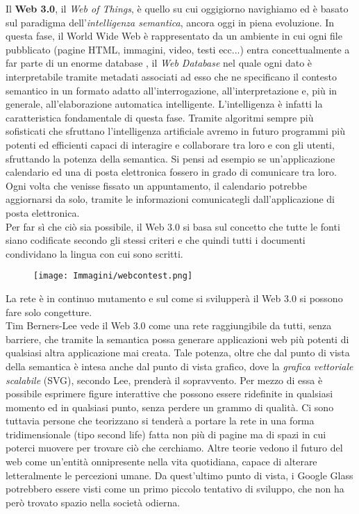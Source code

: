 \documentclass[a4paper, 11pt, oneside]{book}
\theoremstyle{plain}
\begin{document}
Il \textbf{Web 3.0}, il \textit{Web of Things}, è quello su cui oggigiorno navighiamo ed è basato sul paradigma dell'\textit{intelligenza semantica}, ancora oggi in piena evoluzione. In questa fase, il World Wide Web è rappresentato da un ambiente in cui ogni file pubblicato (pagine HTML, immagini, video, testi ecc...) entra concettualmente a far parte di un enorme database , il\textit{ Web Database} nel quale ogni dato è interpretabile tramite metadati associati ad esso che ne specificano il contesto semantico in un formato adatto all'interrogazione, all'interpretazione e, più in generale, all'elaborazione automatica intelligente. L'intelligenza è infatti la caratteristica fondamentale di questa fase. Tramite algoritmi sempre più sofisticati che sfruttano l'intelligenza artificiale avremo in futuro programmi più potenti ed efficienti capaci di interagire e collaborare tra loro e con gli utenti, sfruttando la potenza della semantica. Si pensi ad esempio se un'applicazione calendario ed una di posta elettronica fossero in grado di comunicare tra loro. Ogni volta che venisse fissato un appuntamento, il calendario potrebbe aggiornarsi da solo, tramite le informazioni comunicategli dall'applicazione di posta elettronica.\\ Per far sì che ciò sia possibile, il Web 3.0 si basa sul concetto che tutte le fonti siano codificate secondo gli stessi criteri e che quindi tutti i documenti condividano la lingua con cui sono scritti. \\
\begin{figure}[h]
\begin{center}
\texttt{[image: Immagini/webcontest.png]}

\end{center}
\end{figure}
La rete è in continuo mutamento e sul come si svilupperà il Web 3.0 si possono fare solo congetture.\\Tim Berners-Lee vede il Web 3.0 come una rete raggiungibile da tutti, senza barriere, che tramite la semantica possa generare applicazioni web più potenti di qualsiasi altra applicazione mai creata. Tale potenza, oltre che dal punto di vista della semantica è intesa anche dal punto di vista grafico, dove la \textit{grafica vettoriale scalabile} (SVG), secondo Lee, prenderà il sopravvento. Per mezzo di essa è possibile esprimere figure interattive che possono essere ridefinite in qualsiasi momento ed in qualsiasi punto, senza perdere un grammo di qualità. Ci sono tuttavia persone che teorizzano si tenderà a portare la rete in una forma tridimensionale (tipo second life) fatta non più di pagine ma di spazi in cui poterci muovere per trovare ciò che cerchiamo. Altre teorie vedono il futuro del web come un'entità onnipresente nella vita quotidiana, capace di alterare letteralmente le percezioni umane. Da quest'ultimo punto di vista, i Google Glass potrebbero essere visti come un primo piccolo tentativo di sviluppo, che non ha però trovato spazio nella società odierna. \\
\end{document}
